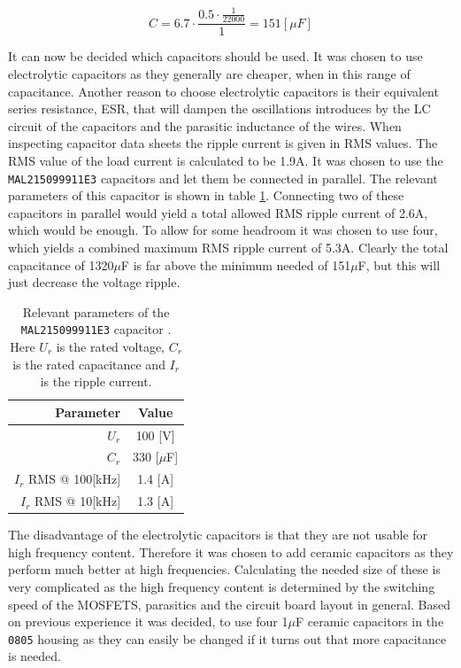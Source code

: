 \begin{equation} 
	C = 6.7 \cdot \frac{0.5 \cdot \frac{1}{22000}}{1 } = 151 [\mu F]
	\label{eq:cap_min_size}
\end{equation}

It can now be decided which capacitors should be used.
It was chosen to use electrolytic capacitors as they generally are cheaper, when in this range of capacitance. 
Another reason to choose electrolytic capacitors is their equivalent series resistance, ESR, that will dampen the oscillations introduces by the LC circuit of the capacitors and the parasitic inductance of the wires.
When inspecting capacitor data sheets the ripple current is given in RMS values. 
The RMS value of the load current is calculated to be 1.9A.
It was chosen to use the \texttt{MAL215099911E3} capacitors and let them be connected in parallel. 
The relevant parameters of this capacitor is shown in table \ref{tab:cap_parameters}.
Connecting two of these capacitors in parallel would yield a total allowed RMS ripple current of 2.6A, which would be enough.
To allow for some headroom it was chosen to use four, which yields a combined maximum RMS ripple current of 5.3A. 
Clearly the total capacitance of 1320$\mu$F is far above the minimum needed of 151$\mu$F, but this will just decrease the voltage ripple.

\begin{table}[tb]
	\centering
	\begin{tabular}{|r|c|}
	\hline
		\textbf{Parameter} & \textbf{Value} \\
	\hline
		$U_r$ & 100 [V]  \\ \hline
		$C_r$ & 330 [$\mu$F]  \\ \hline
		$I_r$ RMS @ 100[kHz] & 1.4 [A]  \\ \hline
		$I_r$ RMS @ 10[kHz] & 1.3 [A]  \\ \hline
		
	\end{tabular}
	\caption{Relevant parameters of the \texttt{MAL215099911E3} capacitor \cite{sup_cap}.
	Here $U_r$ is the rated voltage, $C_r$ is the rated capacitance and $I_r$ is the ripple current.}
	\label{tab:cap_parameters}
\end{table}

The disadvantage of the electrolytic capacitors is that they are not usable for high frequency content.
Therefore it was chosen to add ceramic capacitors as they perform much better at high frequencies. 
Calculating the needed size of these is very complicated as the high frequency content is determined by the switching speed of the MOSFETS, parasitics and the circuit board layout in general. 
Based on previous experience it was decided, to use four 1$\mu$F ceramic capacitors in the \texttt{0805} housing as they can easily be changed if it turns out that more capacitance is needed.

